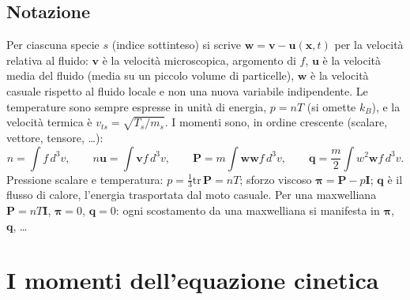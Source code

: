 \subsection{Notazione}
Per ciascuna specie $s$ (indice sottinteso) si scrive $\mathbf{w}=\mathbf{v}-\mathbf{u}(\mathbf{x},t)$ per la velocità relativa al fluido: $\mathbf{v}$ è la velocità microscopica, argomento di $f$, $\mathbf{u}$ è la velocità media del fluido (media su un piccolo volume di particelle), $\mathbf{w}$ è la velocità casuale rispetto al fluido locale e non una nuova variabile indipendente. Le temperature sono sempre espresse in unità di energia, $p=nT$ (si omette $k_B$), e la velocità termica è $v_{ts}=\sqrt{T_s/m_s}$. I momenti sono, in ordine crescente (scalare, vettore, tensore, \dots):
\begin{equation}
n=\int f\,d^3v,\qquad n\mathbf{u}=\int\mathbf{v}f\,d^3v,\qquad \mathbf{P}=m\int\mathbf{w}\mathbf{w}f\,d^3v,\qquad \mathbf{q}=\frac m2\int w^2\mathbf{w}f\,d^3v .
\end{equation}
Pressione scalare e temperatura: $p=\frac13\mathrm{tr}\,\mathbf{P}=nT$; sforzo viscoso $\boldsymbol\pi=\mathbf{P}-p\mathbf{I}$; $\mathbf{q}$ è il flusso di calore, l'energia trasportata dal moto casuale. Per una maxwelliana $\mathbf{P}=nT\mathbf{I}$, $\boldsymbol\pi=0$, $\mathbf{q}=0$: ogni scostamento da una maxwelliana si manifesta in $\boldsymbol\pi$, $\mathbf{q}$, \dots

\section{I momenti dell'equazione cinetica}

